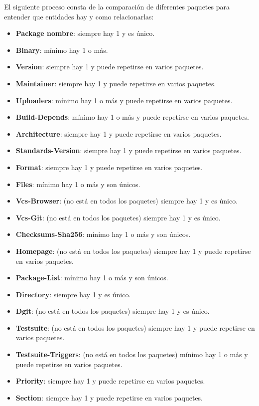 \documentclass[a4paper, 12pt]{book}
\begin{document}
El siguiente proceso consta de la comparación de diferentes paquetes para entender que entidades hay y como relacionarlas:

\begin{itemize}
	\item \textbf {Package nombre}: siempre hay 1 y es único. 
	\item \textbf {Binary}: mínimo hay 1 o más. 
	\item \textbf {Version}: siempre hay 1 y puede repetirse en varios paquetes.
	\item \textbf {Maintainer}: siempre hay 1 y puede repetirse en varios paquetes. 
	\item \textbf {Uploaders}: mínimo hay 1 o más y puede repetirse en varios paquetes. 
	\item \textbf {Build-Depends}: mínimo hay 1 o más y puede repetirse en varios paquetes.  
	\item \textbf {Architecture}: siempre hay 1 y puede repetirse en varios paquetes. 
	\item \textbf {Standards-Version}: siempre hay 1 y puede repetirse en varios paquetes.
	\item \textbf {Format}: siempre hay 1 y puede repetirse en varios paquetes. 
	\item \textbf {Files}:  mínimo hay 1 o más y son únicos. 
	\item \textbf {Vcs-Browser}: (no está en todos los paquetes) siempre hay 1 y es único. 
	\item \textbf {Vcs-Git}: (no está en todos los paquetes) siempre hay 1 y es único. 
	\item \textbf {Checksums-Sha256}: mínimo hay 1 o más y son únicos. 
	\item \textbf {Homepage}: (no está en todos los paquetes) siempre hay 1 y puede repetirse en varios paquetes. 
	\item \textbf {Package-List}: mínimo hay 1 o más y son únicos. 
	\item \textbf {Directory}: siempre hay 1 y es único. 
	\item \textbf {Dgit}: (no está en todos los paquetes) siempre hay 1 y es único. 
	\item \textbf {Testsuite}: (no está en todos los paquetes) siempre hay 1 y puede repetirse en varios paquetes. 
	\item \textbf {Testsuite-Triggers}: (no está en todos los paquetes) mínimo hay 1 o más y puede repetirse en varios paquetes. 
	\item \textbf {Priority}: siempre hay 1 y puede repetirse en varios paquetes. 
	\item \textbf {Section}: siempre hay 1 y puede repetirse en varios paquetes. 
\end{itemize}
\end{document}
